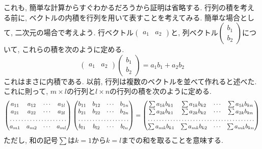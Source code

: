         これも, 簡単な計算からすぐわかるだろうから証明は省略する.
        \clearpage
        行列の積を考える前に, ベクトルの内積を行列を用いて表すことを考えてみる. 簡単な場合として, 二次元の場合で考えよう.
        行ベクトル$\begin{pmatrix}
            a_1 & a_2 
        \end{pmatrix}$と, 列ベクトル$\begin{pmatrix}
            b_1\\b_2
        \end{pmatrix}$について, これらの積を次のように定める.
        \begin{equation*}
            \begin{pmatrix}
            a_1 & a_2 
        \end{pmatrix}\begin{pmatrix}
            b_1\\b_2
        \end{pmatrix}=a_1b_1+a_2b_2
        \end{equation*}
        これはまさに内積である. 以前, 行列は複数のベクトルを並べて作れると述べた. これに則って, $m\times l$の行列と$l\times n$の行列の積を次のように定める.
        \begin{equation}
            \begin{pmatrix}
                a_{11} & a_{12} & \cdots & a_{1l}\\
                a_{21} & a_{22} & \cdots & a_{2l}\\
                \hdotsfor{4}\\
                a_{m1} & a_{m2} & \cdots & a_{ml}
            \end{pmatrix}
            \begin{pmatrix}
                b_{11} & b_{12} & \cdots & b_{1n}\\
                b_{21} & b_{22} & \cdots & b_{2n}\\
                \hdotsfor{4}\\
                b_{l1} & b_{l2} & \cdots & b_{ln}
            \end{pmatrix}                    
            =\begin{pmatrix}
                \sum a_{1k}b_{k1} & \sum a_{1k}b_{k2} & \cdots & \sum a_{1k}b_{kn}\\
                \sum a_{2k}b_{k1} & \sum a_{2k}b_{k2} & \cdots & \sum a_{2k}b_{kn}\\
                \hdotsfor{4}\\
                \sum a_{mk}b_{k1} & \sum a_{mk}b_{k2} & \cdots & \sum a_{mk}b_{kn}
            \end{pmatrix} \label{eq:線形代数:行列の積}
        \end{equation}
        ただし, 和の記号$\sum$は$k=1$から$k=l$までの和を取ることを意味する.

